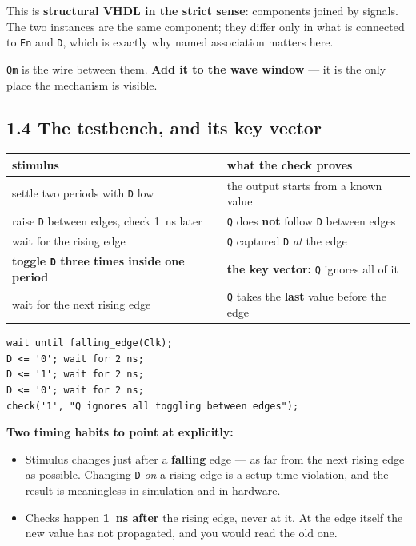 \documentclass[11pt]{article}
\newcommand{\code}[1]{\texttt{#1}}
\begin{document}
This is \textbf{structural VHDL in the strict sense}: components joined by
signals. The two instances are the same component; they differ only in what is
connected to \code{En} and \code{D}, which is exactly why named association
matters here.

\code{Qm} is the wire between them. \textbf{Add it to the wave window} --- it is
the only place the mechanism is visible.

\subsection*{1.4 The testbench, and its key vector}

\begin{center}
\small
\begin{tabular}{>{\raggedright\arraybackslash}p{6.0cm}>{\raggedright\arraybackslash}p{8.2cm}}
\toprule
stimulus & what the check proves \\
\midrule
settle two periods with \code{D} low & the output starts from a known value \\
raise \code{D} between edges, check 1~ns later & \code{Q} does \textbf{not} follow \code{D} between edges \\
wait for the rising edge & \code{Q} captured \code{D} \emph{at} the edge \\
\textbf{toggle \code{D} three times inside one period} & \textbf{the key vector:} \code{Q} ignores all of it \\
wait for the next rising edge & \code{Q} takes the \textbf{last} value before the edge \\
\bottomrule
\end{tabular}
\end{center}

\begin{lstlisting}
wait until falling_edge(Clk);
D <= '0'; wait for 2 ns;
D <= '1'; wait for 2 ns;
D <= '0'; wait for 2 ns;
check('1', "Q ignores all toggling between edges");
\end{lstlisting}

\textbf{Two timing habits to point at explicitly:}

\begin{itemize}[leftmargin=1.6em,itemsep=1pt]
\item Stimulus changes just after a \textbf{falling} edge --- as far from the next
rising edge as possible. Changing \code{D} \emph{on} a rising edge is a setup-time
violation, and the result is meaningless in simulation and in hardware.
\item Checks happen \textbf{1~ns after} the rising edge, never at it. At the edge
itself the new value has not propagated, and you would read the old one.
\end{itemize}
\end{document}
